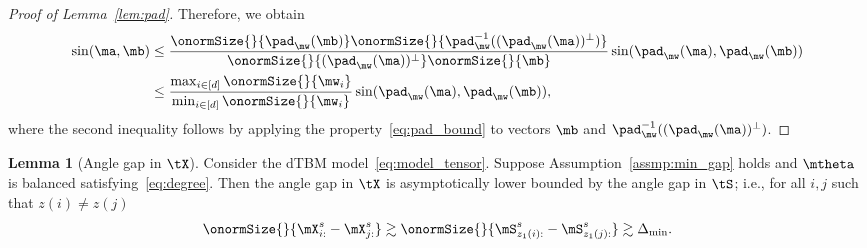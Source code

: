 \documentclass[lettersize,onecolumn,journal]{IEEEtran}
\theoremstyle{definition}
\newtheorem{lem}{Lemma}
\theoremstyle{definition}
\begin{document}
\begin{proof}[Proof of Lemma~\ref{lem:pad}]
Therefore, we obtain 
\begin{align}
    \sin(\ma, \mb) &\leq \frac{ \onormSize{}{\pad_{\mw}(\mb) } \onormSize{}{\pad_{\mw}^{-1}((\pad_{\mw}(\ma))^{\perp})  } }{ \onormSize{}{(\pad_{\mw}(\ma))^{\perp} } \onormSize{}{\mb} }  \sin(\pad_{\mw}(\ma), \pad_{\mw}(\mb))\\
    & \leq \frac{ \max_{i \in [d]} \onormSize{}{\mw_i} }{\min_{i \in [d]} \onormSize{}{\mw_i}} \sin(\pad_{\mw}(\ma), \pad_{\mw}(\mb)),
\end{align}
where the second inequality follows by applying the property~\eqref{eq:pad_bound} to vectors $\mb$ and $\pad_{\mw}^{-1}((\pad_{\mw}(\ma))^{\perp})$.
\end{proof}

\begin{lem}[Angle gap in $\tX$]\label{lem:angle_gap_x} Consider the dTBM model~\eqref{eq:model_tensor}. Suppose Assumption~\ref{assmp:min_gap} holds and $\mtheta$ is balanced satisfying~\eqref{eq:degree}. Then the angle gap in $\tX$ is asymptotically lower bounded by the angle gap in $\tS$; i.e., for all $i,j$ such that $z(i) \neq z(j)$
\begin{equation}
    \onormSize{}{\mX_{i:}^s - \mX_{j:}^s} \gtrsim  \onormSize{}{\mS_{z_1(i):}^s - \mS_{z_1(j):}^s} \gtrsim  \Delta_{\min}.
\end{equation}

\end{lem}
\end{document}
